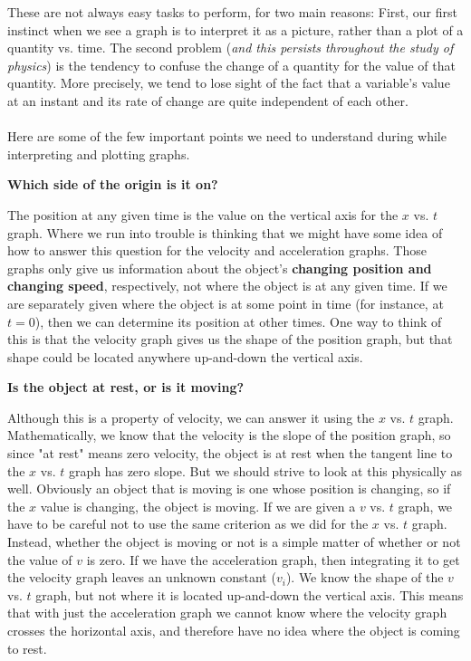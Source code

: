 \documentclass[12pt,addpoints]{exam}
\begin{document}
    These are not always easy tasks to perform, for two main reasons: First, our first instinct when we see a graph is to interpret it as a picture, rather than a plot of a quantity vs. time. The second problem (\textit{and this persists throughout the study of physics}) is the tendency to confuse the change of a quantity for the value of that quantity. More precisely, we tend to lose sight of the fact that a variable's value at an instant and its rate of change are quite independent of each other. \\ \\
    Here are some of the few important points we need to understand during while interpreting and plotting graphs.
    \begin{center}
    	\textbf{Which side of the origin is it on?}
    \end{center}
	The position at any given time is the value on the vertical axis for the $x$
    vs. $t$ graph. Where we run into trouble is thinking that we might have some idea of how to answer this question for the velocity and acceleration graphs. Those graphs only give us information about the object's \textbf{changing position and changing speed}, respectively, not where the object is at any given time. If we are separately given where the object is at some point in time (for instance, at $t=0$), then we can determine its position at other times. One way to think of this is that the velocity graph gives us the shape of the position graph, but that shape could be located anywhere up-and-down the vertical axis. 
    \begin{center}
    	\textbf{Is the object at rest, or is it moving?}
    \end{center}
    Although this is a property of velocity, we can answer it using the $x$ vs. $t$ graph. Mathematically, we know that the velocity is the slope of the position graph, so since "at rest" means zero velocity, the object is at rest when the tangent line to the $x$ vs. $t$ graph has zero slope. But we should strive to look at this physically as well. Obviously an object that is moving is one whose position is changing, so if the $x$ value is changing, the object is moving. If we are given a $v$ vs. $t$ graph, we have to be careful not to use the same criterion as we did for the $x$ vs. $t$
    graph. Instead, whether the object is moving or not is a simple matter of whether or not the value of  $v$ is zero. If we have the acceleration graph, then integrating it to get the velocity graph leaves an unknown constant ($v_i$). We know the shape of the  $v$ vs. $t$ graph, but not where it is located up-and-down the vertical axis. This means that with just the acceleration graph we cannot know where the velocity graph crosses the horizontal axis, and therefore have no idea where the object is coming to rest.
\end{document}
